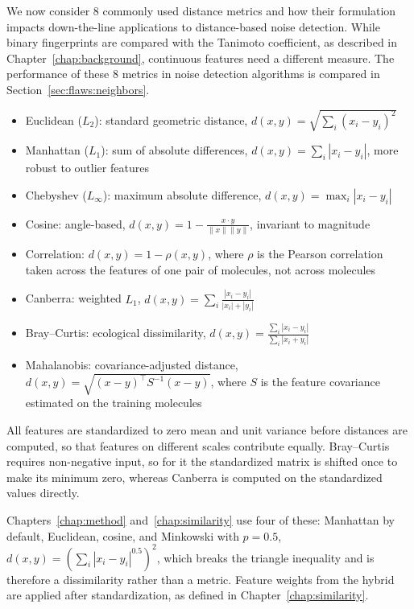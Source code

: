 We now consider 8 commonly used distance metrics and how their formulation impacts down-the-line applications to distance-based noise detection. While binary fingerprints are compared with the Tanimoto coefficient, as described in Chapter~\ref{chap:background}, continuous features need a different measure. The performance of these 8 metrics in noise detection algorithms is compared in Section~\ref{sec:flaws:neighbors}.

\begin{itemize}
    \item Euclidean ($L_2$): standard geometric distance, $d(x, y) = \sqrt{\sum_i (x_i - y_i)^2}$
    \item Manhattan ($L_1$): sum of absolute differences, $d(x, y) = \sum_i |x_i - y_i|$, more robust to outlier features
    \item Chebyshev ($L_\infty$): maximum absolute difference, $d(x, y) = \max_i |x_i - y_i|$
    \item Cosine: angle-based, $d(x, y) = 1 - \frac{x \cdot y}{\|x\| \|y\|}$, invariant to magnitude
    \item Correlation: $d(x, y) = 1 - \rho(x, y)$, where $\rho$ is the Pearson correlation taken across the features of one pair of molecules, not across molecules
    \item Canberra: weighted $L_1$, $d(x, y) = \sum_i \frac{|x_i - y_i|}{|x_i| + |y_i|}$
    \item Bray--Curtis: ecological dissimilarity, $d(x, y) = \frac{\sum_i |x_i - y_i|}{\sum_i |x_i + y_i|}$ \citep{BrayCurtis1957}
    \item Mahalanobis: covariance-adjusted distance, $d(x,y)=\sqrt{(x-y)^\top S^{-1}(x-y)}$, where $S$ is the feature covariance estimated on the training molecules \citep{Mahalanobis1936}
\end{itemize}

All features are standardized to zero mean and unit variance before distances are computed, so that features on different scales contribute equally. Bray--Curtis requires non-negative input, so for it the standardized matrix is shifted once to make its minimum zero, whereas Canberra is computed on the standardized values directly. %

Chapters~\ref{chap:method} and~\ref{chap:similarity} use four of these: Manhattan by default, Euclidean, cosine, and Minkowski with $p=0.5$, $d(x,y)=\left(\sum_i |x_i-y_i|^{0.5}\right)^{2}$, which breaks the triangle inequality and is therefore a dissimilarity rather than a metric. Feature weights from the hybrid are applied after standardization, as defined in Chapter~\ref{chap:similarity}.


